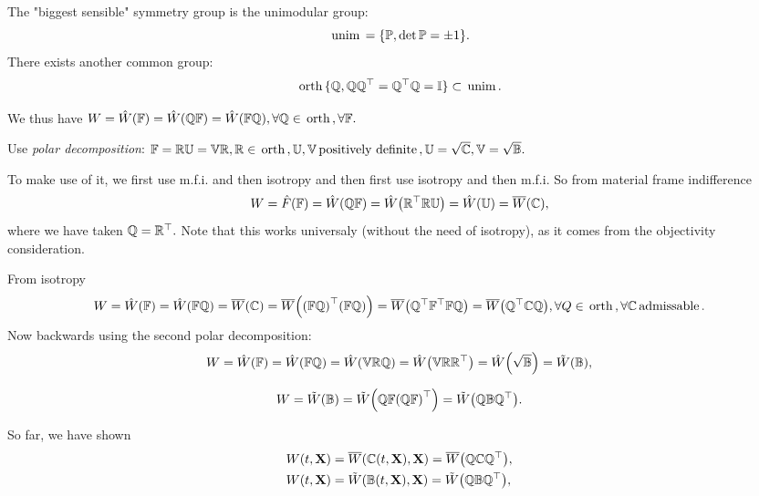 \documentclass[reqno, a4paper]{article}
\begin{document}
\begin{remark}
	The "biggest sensible" symmetry group is the unimodular group:
	\[
		\, \text{unim} \, = \{\mathbb{P}, \det \mathbb{P} = \pm 1\}.
	\]
	There exists another common group:
	\[
		\, \text{orth} \, \{ \mathbb{Q}, \mathbb{Q}\mathbb{Q}^\top = \mathbb{Q}^\top \mathbb{Q} = \mathbb{I}\} \subset \, \text{unim} \,.
	\]
\end{remark}
We thus have $W = \hat{W}\qty(\mathbb{F}) = \hat{W}\qty(\mathbb{Q}\mathbb{F}) = \hat{W}\qty(\mathbb{F} \mathbb{Q}), \forall \mathbb{Q} \in \, \text{orth} \,, \forall \mathbb{F}.$

Use \textit{polar decomposition}: $\mathbb{F} = \mathbb{R}\mathbb{U} = \mathbb{V}\mathbb{R}, \mathbb{R} \in \, \text{orth} \,, \mathbb{U,V} \, \text{positively definite} \,, \mathbb{U} = \sqrt{\mathbb{C}}, \mathbb{V} = \sqrt{\mathbb{B}}.$ 

To make use of it, we first use m.f.i. and then isotropy and then first use isotropy and then m.f.i.
So from material frame indifference
\[
	W = \hat{F}\qty(\mathbb{F}) = \hat{W}\qty(\mathbb{Q}\mathbb{F}) = \hat{W}\qty(\mathbb{R}^\top \mathbb{R} \mathbb{U}) = \hat{W}\qty(\mathbb{U}) = \overline{W}\qty(\mathbb{C}),
\]
where we have taken $\mathbb{Q} = \mathbb{R}^\top.$ Note that this works universaly (without the need of isotropy), as it comes from the objectivity consideration.

From isotropy
\[
	W = \hat{W}\qty(\mathbb{F}) = \hat{W}\qty(\mathbb{F} \mathbb{Q}) = \overline{W}\qty(\mathbb{C}) = \overline{W}\qty(\qty(\mathbb{F} \mathbb{Q})^\top \qty(\mathbb{F} \mathbb{Q})) = \overline{W}\qty(\mathbb{Q}^\top \mathbb{F}^\top\mathbb{F} \mathbb{Q}) = \overline{W}\qty(\mathbb{Q}^\top\mathbb{C} \mathbb{Q}), \forall Q \in \, \text{orth} \,, \forall \mathbb{C} \, \text{admissable} \,.
\]
Now backwards using the second polar decomposition:
\[
	W = \hat{W}\qty(\mathbb{F}) = \hat{W}\qty(\mathbb{F} \mathbb{Q}) = \hat{W}\qty(\mathbb{V}\mathbb{R}\mathbb{Q}) = \hat{W}\qty(\mathbb{V}\mathbb{R}\mathbb{R}^\top) = \hat{W}\qty(\sqrt{\mathbb{B}}) = \tilde{W}\qty(\mathbb{B}),
\]

\[
	W = \tilde{W}\qty(\mathbb{B}) = \tilde{W}\qty(\mathbb{Q}\mathbb{F} \qty(\mathbb{Q}\mathbb{F})^\top) = \tilde{W}\qty(\mathbb{Q}\mathbb{B} \mathbb{Q}^\top).
\]

So far, we have shown
\begin{align*}
	W\qty(t,\vb{X}) &= \overline{W}\qty(\mathbb{C}\qty(t,\vb{X}),\vb{X}) = \overline{W}\qty(\mathbb{Q}\mathbb{C} \mathbb{Q}^\top), \\ W\qty(t,\vb{X}) &= \tilde{W}\qty(\mathbb{B}(t,\vb{X}), \vb{X}) = \tilde{W}\qty(\mathbb{Q} \mathbb{B} \mathbb{Q}^\top),
\end{align*}
\end{document}
